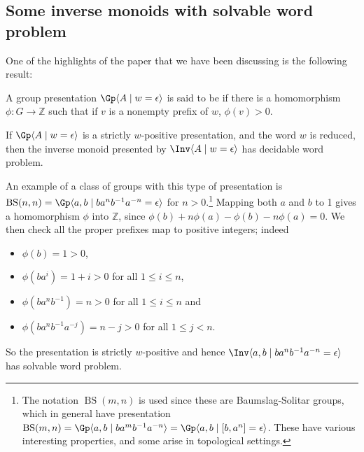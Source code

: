 \documentclass[noindex,noinsetproof,12pt]{lmaths}
\DeclareMathOperator{\BS}{BS}
\begin{document}
\subsection{Some inverse monoids with solvable word problem}

One of the highlights of the paper \cite{Ivanov2001} that we have been discussing is the following result:
\begin{defn}
	A group presentation $\Gp \langle A \mid w = \epsilon \rangle$ is said to be  if there is a homomorphism $\phi : G \to \mathbb{Z}$ such that if $v$ is a nonempty prefix of $w$, $\phi(v) > 0$.
\end{defn}
\begin{theorem} \label{thm:strictly-w-positive-decidable-WP}
	If $\Gp \langle A \mid w = \epsilon \rangle$ is a strictly $w$-positive presentation, and the word $w$ is reduced, then the inverse monoid presented by $\Inv \langle A \mid w = \epsilon \rangle$ has decidable word problem.
\end{theorem}
An example of a class of groups with this type of presentation is $\BS(n, n) = \Gp \langle a, b \mid ba^n b^{-1} a^{-n} = \epsilon \rangle$ for $n > 0$.\footnote{The notation $\BS(m, n)$ is used since these are Baumslag-Solitar groups, which in general have presentation $\BS(m, n) = \Gp \langle a, b \mid ba^mb^{-1}a^{-n}\rangle = \Gp \langle a, b \mid [b, a^n] = \epsilon \rangle$. These have various interesting properties, and some arise in topological settings.} Mapping both $a$ and $b$ to 1 gives a homomorphism $\phi$ into $\mathbb{Z}$, since $\phi(b) + n\phi(a) - \phi(b) - n\phi(a) = 0$. We then check all the proper prefixes map to positive integers; indeed
\begin{itemize}
	\item $\phi(b) = 1 > 0$,
	\item $\phi(ba^i) = 1 + i > 0$ for all $1 \le i \le n$,
	\item $\phi(ba^nb^{-1}) = n > 0$ for all $1 \le i \le n$ and
	\item $\phi(ba^nb^{-1}a^{-j}) = n - j > 0$ for all $1 \le j < n$.
\end{itemize}
So the presentation is strictly $w$-positive and hence $\Inv \langle a, b \mid ba^nb^{-1}a^{-n} = \epsilon \rangle$ has solvable word problem.
\end{document}
